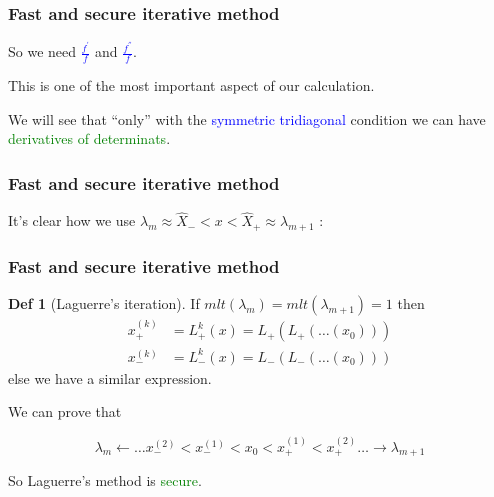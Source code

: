 \documentclass{beamer}
\theoremstyle{definition} \newtheorem{de}{Def}
\theoremstyle{remark} \newtheorem{os}[de]{Remark}
\theoremstyle{plain} \newtheorem{te}[de]{Teo}
\theoremstyle{plain} \newtheorem{co}[de]{Cor}
\theoremstyle{plain} \newtheorem{pr}[de]{Prop}
\theoremstyle{plain} \newtheorem{lem}[de]{Lemm}
\theoremstyle{remark} \newtheorem{rem}[de]{Remark}
\begin{document}
\begin{frame}
  \frametitle{Fast and secure iterative method}
  So we need \textcolor{blue}{$\frac{f^{'}}{f}$} and \textcolor{blue}{$\frac{f^{''}}{f}$}. \\

\pause

This is one of the most important aspect of our calculation. \\

\pause

We will see that ``only'' with the \textcolor{blue}{symmetric tridiagonal} condition we can have \textcolor{green}{derivatives of determinats}.
\end{frame}


\begin{frame}
\frametitle{Fast and secure iterative method}

It's clear how we use $\lambda_m \approx \hat X_{-} < x < \hat X_{+} \approx \lambda_{m+1}$ :


\end{frame}



\begin{frame}[label=BeforeLagProof]
\frametitle{Fast and secure iterative method}

\begin{de}[Laguerre's iteration]
  If $mlt(\lambda_m)=mlt(\lambda_{m+1})=1$ then
  \begin{align*}
    x_{+}^{(k)} &= L_{+}^k(x)=L_{+}(L_{+}(\dots(x_{0})))\\
    x_{-}^{(k)} &= L_{-}^k(x)=L_{-}(L_{-}(\dots(x_{0})))
  \end{align*}
  else we have a similar expression.
\end{de} 

\pause

\hyperlink{LagProof}{} We can prove that

\begin{equation*}
  \lambda_m \leftarrow \dots x_{-}^{(2)} < x_{-}^{(1)} < x_{0} < x_{+}^{(1)} < x_{+}^{(2)} \dots \rightarrow \lambda_{m+1}
\end{equation*}
  
\pause

So Laguerre's method is \textcolor{green}{secure}.

\end{frame}
\end{document}
